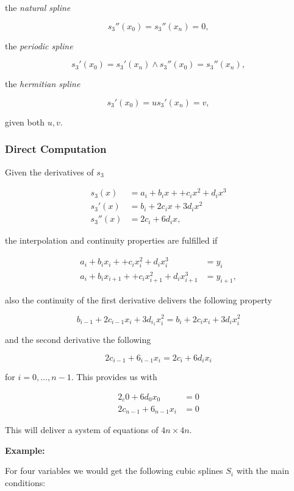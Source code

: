 the \emph{natural spline}

\[
    s_3''(x_0) = s_3 '' (x_n) = 0,
\]

the \emph{periodic spline}

\[
    s_3'(x_0) = s_3'(x_n) \land s_3''(x_0) = s_3''(x_n),
\]

the \emph{hermitian spline}

\[
    s_3'(x_0) = u s_3' (x_n) = v,
\]

given both \(u,v\).

\subsubsection{Direct Computation}

Given the derivatives of \(s_3\)

\begin{align*}
    s_3(x) &= a_i + b_ix + + c_i x^2 + d_i x^3 \\ 
    s_3'(x) &= b_i + 2c_i x + 3d_i x^2 \\ 
    s_3''(x) &= 2c_i + 6d_i x ,
\end{align*}

the interpolation and continuity properties are fulfilled if 

\begin{align*} 
    a_i + b_ix_i + + c_i x_{i}^2 + d_i x_{i}^3 &= y_i \\  
    a_i + b_ix_{i + 1} + + c_i x_{i+1}^2 + d_i x_{i+1}^3 &= y_{i + 1},
\end{align*}

also the continuity of the first derivative delivers the following property 

\[
    b_{i - 1} + 2c_{i - 1}x_i + 3d_{i _ 1}x_i^2 = b_i + 2c_i x_i + 3d_i x_i^2 
\]

and the second derivative the following 

\[
    2c_{i - 1} + 6_{i - 1}x_i = 2c_i + 6d_i x_i
\]

for \(i = 0, \dots, n - 1\). This provides us with 

\begin{align*}
    2_c0 + 6d_0 x_0 &= 0 \\ 
    2c_{n - 1} + 6_{n - 1}x_i &= 0
\end{align*}

This will deliver a system of equations of \(4n \times 4n\).

\textbf{Example:}

For four variables we would get the following cubic splines \(S_i\) with the main conditions:

